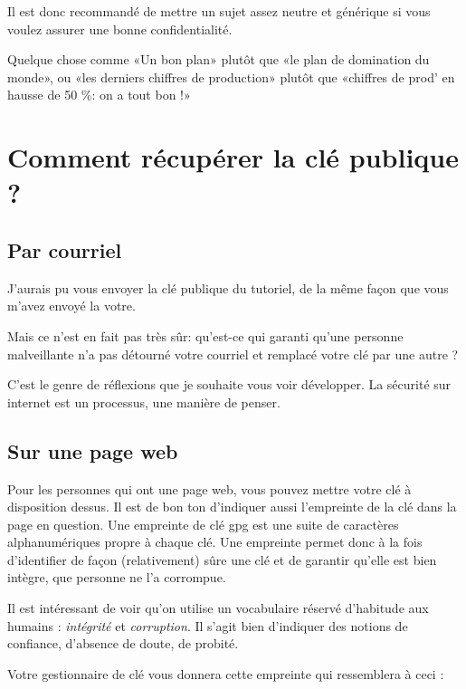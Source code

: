 Il est donc recommandé de mettre un sujet assez neutre et générique si
vous voulez assurer une bonne confidentialité.

Quelque chose comme «Un bon plan» plutôt que «le plan de domination du
monde», ou «les derniers chiffres de production» plutôt que «chiffres de
prod' en hausse de 50 \%: on a tout bon !»

\section{Comment récupérer la clé publique ?}\label{comment-ruxe9cupuxe9rer-la-cluxe9-publique}

\subsection{Par courriel}\label{par-courriel}

J'aurais pu vous envoyer la clé publique du tutoriel, de la même façon
que vous m'avez envoyé la votre.

Mais ce n'est en fait pas très sûr: qu'est-ce qui garanti qu'une
personne malveillante n'a pas détourné votre courriel et remplacé votre
clé par une autre ?

C'est le genre de réflexions que je souhaite vous voir développer. La
sécurité sur internet est un processus, une manière de penser.

\subsection{Sur une page web}\label{sur-une-page-web}

Pour les personnes qui ont une page web, vous pouvez mettre votre clé à
disposition dessus. Il est de bon ton d'indiquer aussi l'empreinte de la
clé dans la page en question. Une empreinte de clé gpg est une suite de caractères alphanumériques
propre à chaque clé. Une empreinte permet donc à la fois d'identifier de
façon (relativement) sûre une clé et de garantir qu'elle est bien
intègre, que personne ne l'a corrompue.

Il est intéressant de voir qu'on utilise un vocabulaire réservé
d'habitude aux humains : \emph{intégrité} et \emph{corruption}. Il
s'agit bien d'indiquer des notions de confiance, d'absence de doute, de
probité.

Votre gestionnaire de clé vous donnera cette empreinte qui ressemblera à
ceci :

\begin{center}
\end{center}

